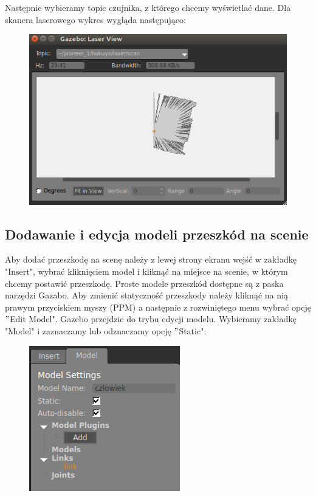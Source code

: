 \documentclass[10pt, a4paper]{article}
\begin{document}
Następnie wybieramy topic czujnika, z którego chcemy wyświetlać dane. Dla skanera laserowego wykres wygląda następująco:

 \begin{figure}[hbt]
  \setlength{\unitlength}{1.0cm}
  \centering 
  
    \includegraphics[width=8 cm]{./grafika/Skaner.png}

\end{figure}
\newpage
\subsection{Dodawanie i edycja modeli przeszkód na scenie}
Aby dodać przeszkodę na scenę należy z lewej strony ekranu wejść w zakładkę "Insert", wybrać kliknięciem model i kliknąć na miejsce na scenie, w którym chcemy postawić przeszkodę. Proste modele przeszkód dostępne są z paska narzędzi Gazabo. 
Aby zmienić statyczność przeszkody należy kliknąć na nią prawym przyciskiem myszy (PPM) a następnie z rozwiniętego menu wybrać opcję $"$Edit Model". Gazebo przejdzie do trybu edycji modelu. Wybieramy zakładkę "Model" i zaznaczamy lub odznaczamy opcję $"$Static":

\begin{figure}[hbt]
  \setlength{\unitlength}{1.0cm}
  \centering 
  
    \includegraphics[width=6 cm]{./grafika/Edit.png}

\end{figure}
\end{document}

